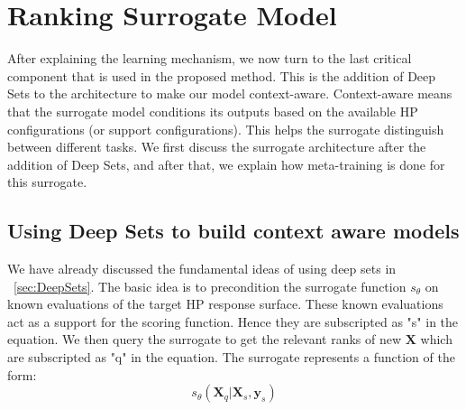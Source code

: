 \documentclass[12pt, twoside, ngerman]{report}
\begin{document}
\section{Ranking Surrogate Model}

After explaining the learning mechanism, we now turn to the last critical component that is used in the proposed method.
This is the addition of Deep Sets to the architecture to make our model context-aware.
Context-aware means that the surrogate model conditions its outputs based on the available HP configurations (or support configurations).
This helps the surrogate distinguish between different tasks.
We first discuss the surrogate architecture after the addition of Deep Sets, and after that, we explain how meta-training is done for this surrogate.

\subsection{Using Deep Sets to build context aware models}\label{sec:DeepSetWithModel}

We have already discussed the fundamental ideas of using deep sets in  ~\ref{sec:DeepSets}.
The basic idea is to precondition the surrogate function $s_{\theta}$ on known evaluations of the target HP response surface.
These known evaluations act as a support for the scoring function.
Hence they are subscripted as "s" in the equation.
We then query the surrogate to get the relevant ranks of new $\textbf{X}$ which are subscripted as "q" in the equation.
The surrogate represents a function of the form:
$$
s_{\theta}(\textbf{X}_{q} | \textbf{X}_{s}, \textbf{y}_{s})
$$
\end{document}
